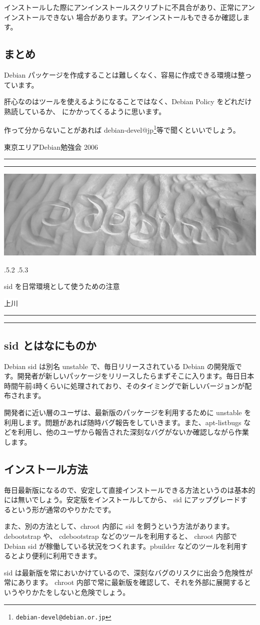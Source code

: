 \documentclass[mingoth,a4paper]{jsarticle}
\makeatletter
\renewcommand{\section}{\@startsection{section}{1}{\z@}%
    {\Cvs \@plus.5\Cdp \@minus.2\Cdp}%
    {.5\Cvs \@plus.3\Cdp}%
    {\normalfont\Huge\headfont\raggedright\centering}} %
\newcommand{\dancersection}[2]{%
\newpage
東京エリアDebian勉強会 2006
\hrule
\vspace{0.5mm}
\hrule
\hfill{}\includegraphics[width=16cm]{image2006-natsu/guruguru-sand-light.png}\\
\vspace{-5cm}
\begin{center}
\section{#1}
\end{center}
\hfill{}\colorbox{white}{#2}\hspace{3cm}\space\\
\vspace{1cm}
\hrule
\vspace{0.5mm}
\hrule
\vspace{1cm}
}
\makeatother
\begin{document}
		インストールした際にアンインストールスクリプトに不具合があり、正常にアンインストールできない
		場合があります。アンインストールもできるか確認します。

\subsection{まとめ}
	Debian パッケージを作成することは難しくなく、容易に作成できる環境は整っています。
	
	肝心なのはツールを使えるようになることではなく、Debian Policy をどれだけ熟読しているか、
	にかかってくるように思います。
	
	作って分からないことがあれば debian-devel@jp\footnote{\texttt{debian-devel@debian.or.jp}}等で聞くといいでしょう。	
	

\dancersection{sid を日常環境として使うための注意}{上川}
\label{sec:YYY}

\subsection{sid とはなにものか}

Debian sid は別名 unstable で、毎日リリースされている Debian の開発版で
す。開発者が新しいパッケージをリリースしたらまずそこに入ります。毎日日本
時間午前4時くらいに処理されており、そのタイミングで新しいバージョンが配
布されます。

開発者に近い層のユーザは、最新版のパッケージを利用するために unstable を
利用します。問題があれば随時バグ報告をしていきます。また、apt-listbugs
などを利用し、他のユーザから報告された深刻なバグがないか確認しながら作業
します。


\subsection{インストール方法}

毎日最新版になるので、安定して直接インストールできる方法というのは基本的
には無いでしょう。安定版をインストールしてから、 sid にアップグレードす
るという形が通常のやりかたです。

また、別の方法として、chroot 内部に sid を飼うという方法があります。
debootstrap や、 cdebootstrap などのツールを利用すると、 chroot 内部で
Debian sid が稼働している状況をつくれます。pbuilder などのツールを利用す
るとより便利に利用できます。

sid は最新版を常においかけているので、深刻なバグのリスクに出会う危険性が
常にあります。 chroot 内部で常に最新版を確認して、それを外部に展開すると
いうやりかたをしないと危険でしょう。
\end{document}

